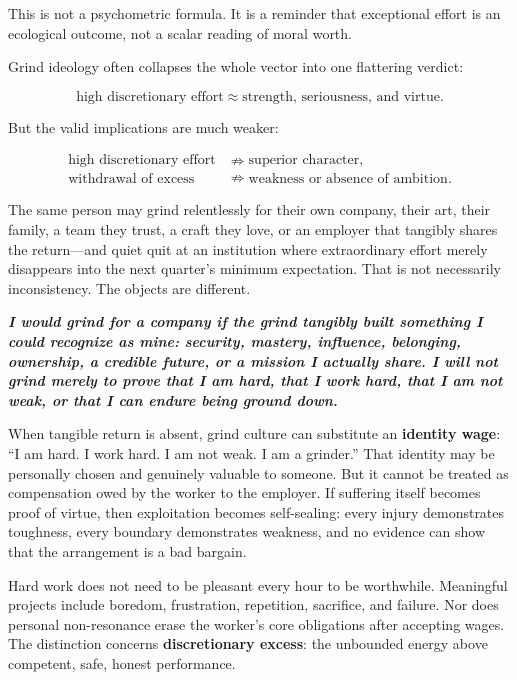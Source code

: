 \documentclass[11pt,oneside]{article}
\renewenvironment{quote}
  {\begin{tcolorbox}[
      enhanced,
      breakable,
      colback=ManifestLight,
      colframe=ManifestRule,
      boxrule=0pt,
      leftrule=3pt,
      arc=0pt,
      outer arc=0pt,
      left=10pt,right=10pt,top=8pt,bottom=8pt,
      before skip=0.8em,after skip=0.8em
    ]\itshape}
  {\end{tcolorbox}}
\begin{document}
This is not a psychometric formula. It is a reminder that exceptional
effort is an ecological outcome, not a scalar reading of moral worth.

Grind ideology often collapses the whole vector into one flattering
verdict:

\[
\text{high discretionary effort}
\approx
\text{strength, seriousness, and virtue}.
\]

But the valid implications are much weaker:

\[
\begin{aligned}
\text{high discretionary effort}
&\nRightarrow
\text{superior character},\\
\text{withdrawal of excess}
&\nRightarrow
\text{weakness or absence of ambition}.
\end{aligned}
\]

The same person may grind relentlessly for their own company, their art,
their family, a team they trust, a craft they love, or an employer that
tangibly shares the return---and quiet quit at an institution where
extraordinary effort merely disappears into the next quarter's minimum
expectation. That is not necessarily inconsistency. The objects are
different.

\begin{quote}
\textbf{I would grind for a company if the grind tangibly built something
I could recognize as mine: security, mastery, influence, belonging,
ownership, a credible future, or a mission I actually share. I will not
grind merely to prove that I am hard, that I work hard, that I am not
weak, or that I can endure being ground down.}
\end{quote}

When tangible return is absent, grind culture can substitute an
\textbf{identity wage}: ``I am hard. I work hard. I am not weak. I am a
grinder.'' That identity may be personally chosen and genuinely valuable
to someone. But it cannot be treated as compensation owed by the worker
to the employer. If suffering itself becomes proof of virtue, then
exploitation becomes self-sealing: every injury demonstrates toughness,
every boundary demonstrates weakness, and no evidence can show that the
arrangement is a bad bargain.

Hard work does not need to be pleasant every hour to be worthwhile.
Meaningful projects include boredom, frustration, repetition, sacrifice,
and failure. Nor does personal non-resonance erase the worker's core
obligations after accepting wages. The distinction concerns
\textbf{discretionary excess}: the unbounded energy above competent,
safe, honest performance.
\end{document}
